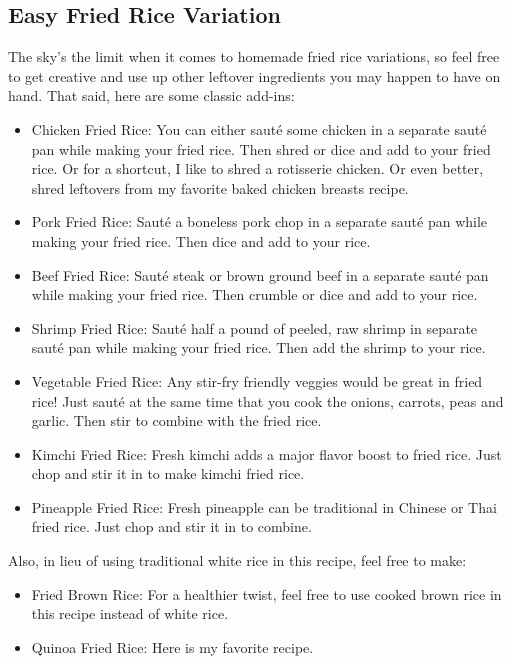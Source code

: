 \subsection{Easy Fried Rice Variation}
The sky's the limit when it comes to homemade fried rice variations, so feel free to get creative and use up other leftover ingredients you may happen to have on hand.
That said, here are some classic add-ins:
\begin{itemize}
  \item Chicken Fried Rice: You can either saut\'{e} some chicken in a separate saut\'{e} pan while making your fried rice.  Then shred or dice and add to your fried rice.  Or for a shortcut, I like to shred a rotisserie chicken.  Or even better, shred leftovers from my favorite baked chicken breasts recipe.
  \item Pork Fried Rice: Saut\'{e} a boneless pork chop in a separate saut\'{e} pan while making your fried rice.  Then dice and add to your rice.
  \item Beef Fried Rice: Saut\'{e} steak or brown ground beef in a separate saut\'{e} pan while making your fried rice.  Then crumble or dice and add to your rice.
  \item Shrimp Fried Rice: Saut\'{e} half a pound of peeled, raw shrimp in separate saut\'{e} pan while making your fried rice.  Then add the shrimp to your rice.
  \item Vegetable Fried Rice: Any stir-fry friendly veggies would be great in fried rice!  Just saut\'{e} at the same time that you cook the onions, carrots, peas and garlic.  Then stir to combine with the fried rice.
  \item Kimchi Fried Rice: Fresh kimchi adds a major flavor boost to fried rice.  Just chop and stir it in to make kimchi fried rice.
  \item Pineapple Fried Rice: Fresh pineapple can be traditional in Chinese or Thai fried rice.  Just chop and stir it in to combine.
\end{itemize}
Also, in lieu of using traditional white rice in this recipe, feel free to make:
\begin{itemize}
  \item Fried Brown Rice: For a healthier twist, feel free to use cooked brown rice in this recipe instead of white rice.
  \item Quinoa Fried Rice: Here is my favorite recipe.
\end{itemize}

